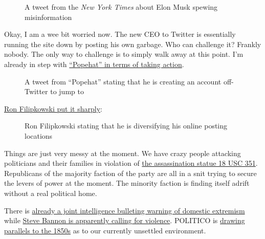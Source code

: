 \begin{figure}
\centering
{}
\caption{A tweet from the \emph{New York Times} about Elon Musk spewing
misinformation}
\end{figure}

Okay, I am a wee bit worried now. The new CEO to Twitter is essentially
running the site down by posting his own garbage. Who can challenge it?
Frankly nobody. The only way to challenge is to simply walk away at this
point. I'm already in step with
\href{https://twitter.com/popehat/status/1586444996189728768}{``Popehat''
in terms of taking action}.

\begin{figure}
\centering
{}
\caption{A tweet from ``Popehat'' stating that he is creating an account
off-Twitter to jump to}
\end{figure}

\href{https://twitter.com/ronfilipkowski/status/1586754844043485191}{Ron
Filipkowski put it sharply}:

\begin{figure}
\centering
{}
\caption{Ron Filipkowski stating that he is diversifying his online
posting locations}
\end{figure}

Things are just very messy at the moment. We have crazy people attacking
politicians and their families in violation of
\href{https://www.law.cornell.edu/uscode/text/18/351}{the assassination
statue 18 USC 351}. Republicans of the majority faction of the party are
all in a snit trying to secure the levers of power at the moment. The
minority faction is finding itself adrift without a real political home.

There is
\href{https://www.opb.org/article/2022/10/29/ahead-of-election-day-us-agencies-warn-of-potential-attacks-by-extremists/}{already
a joint intelligence bulleting warning of domestic extremism} while
\href{https://www.msn.com/en-us/news/politics/steve-bannon-calls-maga-community-to-arms-says-theyre-the-cavalry/ar-AA13w2Wj}{Steve
Bannon is apparently calling for violence}. POLITICO is
\href{https://www.politico.com/news/magazine/2022/10/29/political-violence-1850s-paul-pelosi-00064107}{drawing
parallels to the 1850s} as to our currently unsettled environment.

